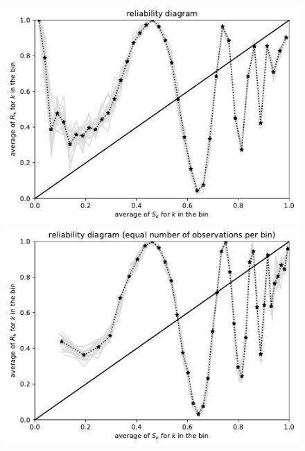 \documentclass{article}
\begin{document}
\begin{figure}
\begin{centering}
\parbox{\imsize}{\includegraphics[width=\imsize]
                {./codes/unweighted/10000_40_2_1/equiprob.pdf}}
\quad\quad
\parbox{\imsize}{\includegraphics[width=\imsize]
                {./codes/unweighted/10000_40_2_1/equisamp.pdf}}

\vspace{\vertsep}


\end{centering}
\end{figure}
\end{document}
